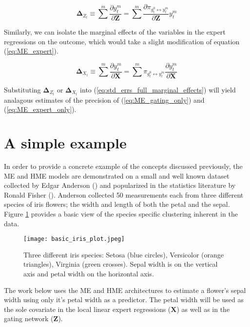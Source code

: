 \documentclass[12pt]{article}
\newcommand{\gateprod}[2]{\pi_{#1 \longleftrightarrow #2}}
\begin{document}
\begin{equation} \label{eq:ME_gating_only}
  \boldsymbol{\Delta}_{Z_{t}} \equiv \sum^{m} \frac{\partial y_{t}^{m}}{\partial \boldsymbol{Z}} = \sum^{m} \frac{\partial \gateprod{g^{0}_{t}}{y^{m}_{t}}}{{\partial \boldsymbol{Z}}} y^{m}_{t}
\end{equation}

Similarly, we can isolate the marginal effects of the variables in the
expert regressions on the outcome, which would take a slight modification
of equation (\ref{eq:ME_expert}). 

\begin{equation} \label{eq:ME_expert_only}
  \boldsymbol{\Delta}_{X_{t}} \equiv \sum^{m} \frac{\partial y_{t}^{m}}{\partial \boldsymbol{X}} = \sum^{m} \gateprod{g^{0}_{t}}{y^{m}_{t}} \frac{\partial y^{m}_{t}}{{\partial \boldsymbol{X}}}
\end{equation}

Substituting $\boldsymbol{\Delta}_{Z_{t}}$ or $\boldsymbol{\Delta}_{X_{t}}$
into (\ref{eq:std_errs_full_marginal_effects}) will yield analagous estimates of 
the precision of (\ref{eq:ME_gating_only}) and (\ref{eq:ME_expert_only}). 

\section{A simple example} \label{sec:SimpleExample}

In order to provide a concrete example of the concepts discussed previously,
the ME and HME models are demonstrated on a small and well known dataset
collected by Edgar Anderson (\cite{Anderson1936}) and popularized in the
statistics literature by Ronald Fisher (\cite{Fisher1936}). Anderson collected
50 measurements each from three different species of iris flowers; the width and
length of both the petal and the sepal. Figure \ref{fig:Iris_dataset} provides a
basic view of the species specific clustering inherent in the data.

\begin{figure}[!ht]
  \texttt{[image: basic\_iris\_plot.jpeg]}
  \caption{Three different iris species: Setosa
  (blue circles), Versicolor (orange triangles), Virginia (green crosses).
  Sepal width is on the vertical axis and petal width on the horizontal
  axis.}
  \label{fig:Iris_dataset}
\end{figure}

The work below uses the ME and HME architectures to estimate a flower's sepal
width using only it's petal width as a predictor. The petal width will be used
as the sole covariate in the local linear expert regressions ($\boldsymbol{X}$) as well as
in the gating network ($\boldsymbol{Z}$). 
\end{document}
